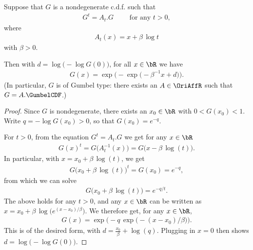 \begin{lemma}[Self-similar continuous c.d.f. family characterization $\gamma = 0$]
  \label{lem:characterization-self-similar-family-zero-index}
  Suppose that $G$ is a nondegenerate c.d.f. such that
  \begin{align*}
    G^{t} = A_t . G \qquad \text{ for any } t > 0 ,
  \end{align*}
  where
  \begin{align*}
    A_t(x) = x + \beta \, \log t
  \end{align*}
  with $\beta > 0$.

  Then with $d = \log \big(-\log G(0) \big)$,
  for all $x \in \bR$ we have
  \begin{align*}
    G(x) = \exp \Big( - \exp \big( -\beta^{-1} x + d \big) \Big) .
  \end{align*}
  (In particular, $G$ is of Gumbel type: there exists an $A \in \OriAffR$
  such that $G = A.\GumbelCDF$.)
\end{lemma}
\begin{proof}

  Since $G$ is nondegenerate, there exists an $x_0 \in \bR$
  with $0 < G(x_0) < 1$. Write $q = -\log G(x_0) > 0$,
  so that $G(x_0) = e^{-q}$.

  For $t > 0$, from the equation $G^{t} = A_t . G$
  we get for any $x \in \bR$
  \begin{align*}
  G(x)^t = G \big( A_t^{-1}(x) \big) = G \big( x - \beta \, \log(t) \big) .
  \end{align*}
  In particular, with $x = x_0 + \beta \, \log(t)$, we get
  \begin{align*}
    G\big( x_0 + \beta \, \log(t) \big)^{t} = G(x_0) = e^{- q},
  \end{align*}
  from which we can solve
  \begin{align*}
    G\big( x_0 + \beta \, \log(t) \big) = e^{-q/t} .
  \end{align*}
  The above holds for any $t>0$, and any $x \in \bR$
  can be written as $x = x_0 + \beta \, \log\big( e^{(x - x_0)/\beta} \big)$.
  We therefore get, for any $x \in \bR$,
  \begin{align*}
    G(x) = \exp \Big( - q \, \exp \big( -(x-x_0)/\beta \big) \Big) .
  \end{align*}
  This is of the desired form, with $d = \frac{x_0}{\beta} + \log(q)$.
  Plugging in $x = 0$ then shows $d = \log \big(-\log G(0) \big)$.
\end{proof}

